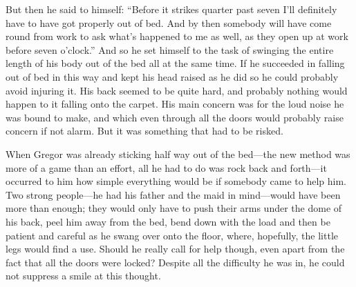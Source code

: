 But then he said to himself: “Before it strikes quarter past seven I’ll
definitely have to have got properly out of bed. And by then somebody
will have come round from work to ask what’s happened to me as well, as
they open up at work before seven o’clock.” And so he set himself to
the task of swinging the entire length of his body out of the bed all
at the same time. If he succeeded in falling out of bed in this way and
kept his head raised as he did so he could probably avoid injuring it.
His back seemed to be quite hard, and probably nothing would happen to
it falling onto the carpet. His main concern was for the loud noise he
was bound to make, and which even through all the doors would probably
raise concern if not alarm. But it was something that had to be risked.

When Gregor was already sticking half way out of the bed—the new method
was more of a game than an effort, all he had to do was rock back and
forth—it occurred to him how simple everything would be if somebody
came to help him. Two strong people—he had his father and the maid in
mind—would have been more than enough; they would only have to push
their arms under the dome of his back, peel him away from the bed, bend
down with the load and then be patient and careful as he swang over
onto the floor, where, hopefully, the little legs would find a use.
Should he really call for help though, even apart from the fact that
all the doors were locked? Despite all the difficulty he was in, he
could not suppress a smile at this thought.

